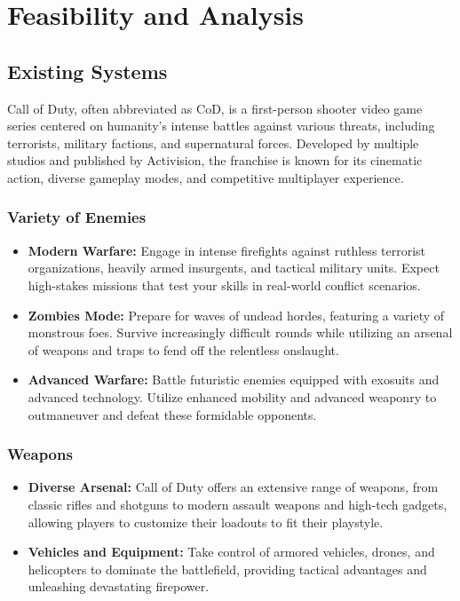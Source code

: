 \chapter{Feasibility and Analysis}

\section{Existing Systems}
Call of Duty, often abbreviated as CoD, is a first-person shooter video game series centered on humanity's intense battles against various threats, including terrorists, military factions, and supernatural forces. Developed by multiple studios and published by Activision, the franchise is known for its cinematic action, diverse gameplay modes, and competitive multiplayer experience.
\subsection{Variety of Enemies}
\begin{itemize}
	\item \textbf{Modern Warfare:} Engage in intense firefights against ruthless terrorist organizations, heavily armed insurgents, and tactical military units. Expect high-stakes missions that test your skills in real-world conflict scenarios.
	\item \textbf{Zombies Mode:} Prepare for waves of undead hordes, featuring a variety of monstrous foes. Survive increasingly difficult rounds while utilizing an arsenal of weapons and traps to fend off the relentless onslaught.
	\item \textbf{Advanced Warfare:} Battle futuristic enemies equipped with exosuits and advanced technology. Utilize enhanced mobility and advanced weaponry to outmaneuver and defeat these formidable opponents.
\end{itemize}

\subsection{Weapons}
\begin{itemize}
	\item \textbf{Diverse Arsenal:} Call of Duty offers an extensive range of weapons, from classic rifles and shotguns to modern assault weapons and high-tech gadgets, allowing players to customize their loadouts to fit their playstyle.
	\item \textbf{Vehicles and Equipment:} Take control of armored vehicles, drones, and helicopters to dominate the battlefield, providing tactical advantages and unleashing devastating firepower.
\end{itemize}

